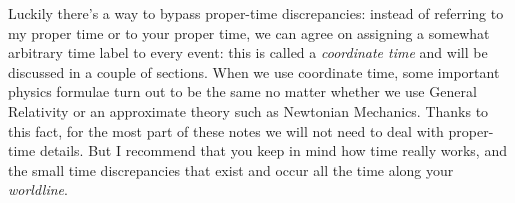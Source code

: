 \documentclass[a4paper,12pt,%
onecolumn,oneside,%
british%
]{memoir}
\renewcommand*{\|}[1][]{\nonscript\:#1\vert\nonscript\:\mathopen{}}
\begin{document}
Luckily there's a way to bypass proper-time discrepancies: instead of referring to my proper time or to your proper time, we can agree on assigning a somewhat arbitrary time label to every event: this is called a \emph{coordinate time} and will be discussed in a couple of sections.
%
%
When we use coordinate time, some important physics formulae turn out to be the same no matter whether we use General Relativity or an approximate theory such as Newtonian Mechanics. Thanks to this fact, for the most part of these notes we will not need to deal with proper-time details. But I recommend that you keep in mind how time really works, and the small time discrepancies that exist and occur all the time along your \emph{worldline}.
\end{document}
